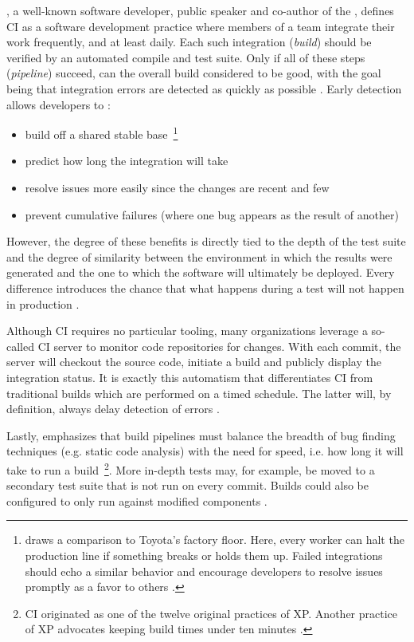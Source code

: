 \begin{appendices}
\citeauthor{fowler2006continuous}, a well-known software developer, public speaker and co-author of the , defines \ac{CI} as a software development practice where members of a team integrate their work frequently, and at least daily. Each such integration (\textit{build}) should be verified by an automated compile and test suite. Only if all of these steps (\textit{pipeline}) succeed, can the overall build considered to be good, with the goal being that integration errors are detected as quickly as possible \cite[pp.~1,~3]{fowler2006continuous}. Early detection allows developers to \cite[pp.~7,~11--12]{fowler2006continuous}:

\begin{itemize}
  \item build off a shared stable base~\footnote{\citeauthor{meyer2014continuous} draws a comparison to Toyota's factory floor. Here, every worker can halt the production line if something breaks or holds them up. Failed integrations should echo a similar behavior and encourage developers to resolve issues promptly as a favor to others \cite[p.~15]{meyer2014continuous}.}
  \item predict how long the integration will take
  \item resolve issues more easily since the changes are recent and few
  \item prevent cumulative failures (where one bug appears as the result of another)
\end{itemize}

However, the degree of these benefits is directly tied to the depth of the test suite and the degree of similarity between the environment in which the results were generated and the one to which the software will ultimately be deployed. Every difference introduces the chance that what happens during a test will not happen in production \cite[pp.~9,~12]{fowler2006continuous}.

Although \ac{CI} requires no particular tooling, many organizations leverage a so-called \ac{CI} server to monitor code repositories for changes. With each commit, the server will checkout the source code, initiate a build and publicly display the integration status. It is exactly this automatism that differentiates \ac{CI} from traditional builds which are performed on a timed schedule. The latter will, by definition, always delay detection of errors \cite[pp.~7,~10]{fowler2006continuous}.

Lastly, \citeauthor{fowler2006continuous} emphasizes that build pipelines must balance the breadth of bug finding techniques (e.g. static code analysis) with the need for speed, i.e. how long it will take to run a build~\footnote{\ac{CI} originated as one of the twelve original practices of \ac{XP}. Another practice of \ac{XP} advocates keeping build times under ten minutes \cite[pp.~2,~8]{fowler2006continuous}.}. More in-depth tests may, for example, be moved to a secondary test suite that is not run on every commit. Builds could also be configured to only run against modified components \cite[pp.~5,~8]{fowler2006continuous}.



\end{appendices}
